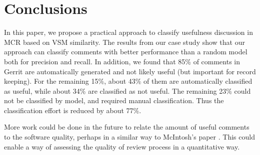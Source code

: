 
\section{Conclusions}

In this paper, we propose a practical approach to classify usefulness discussion in MCR based on VSM similarity.
The results from our case study show that our approach can classify comments with better performance than a random model both for precision and recall.
In addition, we found that 85\% of comments in Gerrit are automatically generated and not likely useful (but important for record keeping).
For the remaining 15\%, about 43\% of them are automatically classified as useful, while about 34\% are classified as not useful.
The remaining 23\% could not be classified by model, and required manual classification.
Thus the classification effort is reduced by about 77\%.

More work could be done in the future to relate the amount of useful comments to the software quality, perhaps in a similar way to McIntosh's paper \cite{Mcintosh}.
This could enable a way of assessing the quality of review process in a quantitative way.